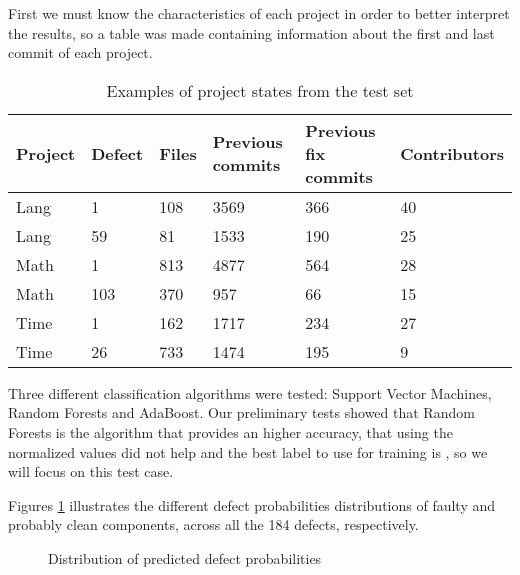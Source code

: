 First we must know the characteristics of each project in order to better interpret the results, so a table was made containing information about the first and last commit of each
project.
%
\begin{table}[H]
\centering
\begin{tabular}{|l|l|l|l|l|l|}
\hline
\textbf{Project} & \textbf{Defect} & \textbf{Files} & \textbf{Previous commits} & \textbf{Previous fix commits} & \textbf{Contributors} \\ \hline
Lang             & 1               & 108            & 3569                      & 366                           & 40                    \\ \hline
Lang             & 59              & 81             & 1533                      & 190                           & 25                    \\ \hline
Math             & 1               & 813            & 4877                      & 564                           & 28                    \\ \hline
Math             & 103             & 370            & 957                       & 66                            & 15                    \\ \hline
Time             & 1               & 162            & 1717                      & 234                           & 27                    \\ \hline
Time             & 26              & 733            & 1474                      & 195                           & 9                     \\ \hline
\end{tabular}
\caption{Examples of project states from the test set}
\label{test-set-examples}
\end{table}

Three different classification algorithms were tested: Support Vector Machines, Random Forests and AdaBoost.
Our preliminary tests showed that Random Forests is the algorithm that provides an higher accuracy, that using the normalized values did not help and the best label to use for training is , so we will focus on this test case.

Figures \ref{fig:dp-count-dist} illustrates the different defect probabilities distributions of faulty and probably clean components, across all the 184 defects, respectively.
%
\begin{figure}[ht]%
    \centering
    \qquad
    \caption{Distribution of predicted defect probabilities}%
    \label{fig:dp-count-dist}%
\end{figure}

